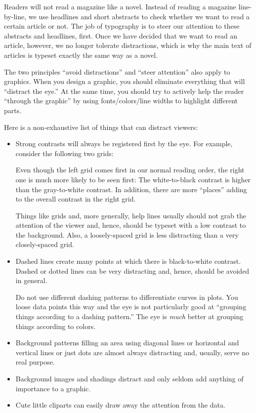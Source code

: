 Readers will not read a magazine like a novel. Instead of reading a
magazine line-by-line, we use headlines and short abstracts to check
whether we want to read a certain article or not. The job of
typography is to steer our attention to these abstracts and headlines,
first. Once we have decided that we want to read an article, however,
we no longer tolerate distractions, which is why the main text of
articles is typeset exactly the same way as a novel.

The two principles ``avoid distractions'' and ``steer attention'' also
apply to graphics. When you design a graphic, you should eliminate
everything that will ``distract the eye.'' At the same time, you
should try to actively help the reader ``through the graphic'' by
using fonts/colors/line widths to highlight different parts.

Here is a non-exhaustive list of things that can distract viewers:
\begin{itemize}
\item
  Strong contrasts will always be registered first by the eye. For
  example, consider the following two grids:

  \medskip\par

  \medskip
  Even though the left grid comes first in our normal reading order,
  the right one is much more likely to be seen first: The
  white-to-black contrast is higher than the gray-to-white
  contrast. In addition, there are more ``places'' adding to the
  overall contrast in the right grid.

  Things like grids and, more generally, help lines usually should not
  grab the attention of the viewer and, hence, should be typeset with
  a low contrast to the background. Also, a loosely-spaced grid is
  less distracting than a very closely-spaced grid.
\item
  Dashed lines create many points at which there is black-to-white
  contrast. Dashed or dotted lines can be very distracting and, hence,
  should be avoided in general.

  Do not use different dashing patterns to differentiate curves in
  plots. You loose data points this way and the eye is not
  particularly good at ``grouping things according to a dashing
  pattern.'' The eye is \emph{much} better at grouping things
  according to colors.
\item
  Background patterns filling an area using  diagonal lines or
  horizontal and vertical lines or just dots are almost always
  distracting and, usually, serve no real purpose.
\item
  Background images and shadings distract and only seldom add
  anything of importance to a graphic.
\item
  Cute little cliparts can easily draw away the attention from the
  data.
\end{itemize}

